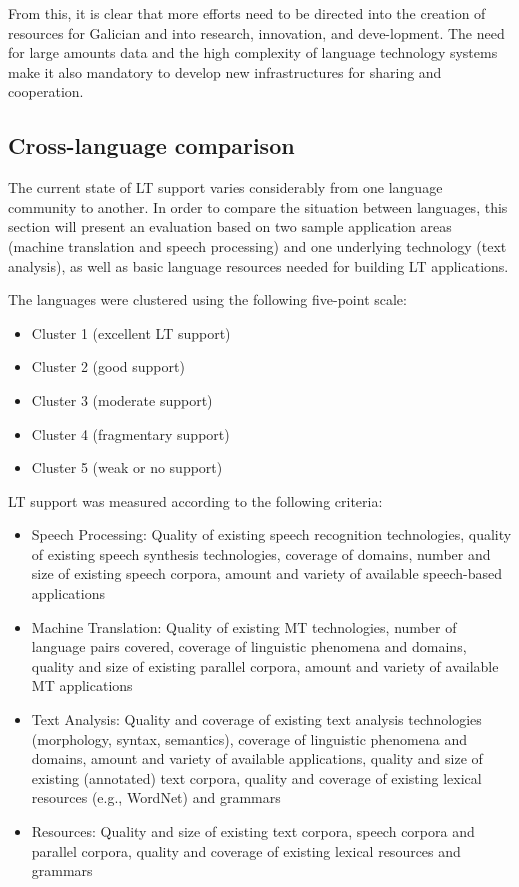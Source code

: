 \begin{multicols}{2}
\begin{itemize}
\begin{multicols}{2}
From this, it is clear that more efforts need to be directed into the creation of resources for Galician and into research, innovation, and deve-lopment. The need for large amounts data and the high complexity of language technology systems make it also mandatory to develop new infrastructures for sharing and cooperation.


\subsection{Cross-language comparison}

    The current state of LT support varies considerably from one language community to another. In order to compare the situation between languages, this section will present an evaluation based on two sample application areas (machine translation and speech processing) and one underlying technology (text analysis), as well as basic language resources needed for building LT applications. 

The languages were clustered using the following five-point scale: 

    \begin{itemize}
      \item Cluster 1 (excellent LT support)
      \item Cluster 2 (good support)
      \item Cluster 3 (moderate support)
      \item Cluster 4 (fragmentary support) 
      \item Cluster 5 (weak or no support)
    \end{itemize}

LT support was measured according to the following criteria:
\begin{itemize}
\item Speech Processing: Quality of existing speech recognition technologies, quality of existing speech synthesis technologies, coverage of domains, number and size of existing speech corpora, amount and variety of available speech-based applications
\item Machine Translation: Quality of existing MT technologies, number of language pairs covered, coverage of linguistic phenomena and domains, quality and size of existing parallel corpora, amount and variety of available MT applications
\item Text Analysis: Quality and coverage of existing text analysis technologies (morphology, syntax, semantics), coverage of linguistic phenomena and domains, amount and variety of available applications, quality and size of existing (annotated) text corpora, quality and coverage of existing lexical resources (e.g., WordNet) and grammars
\item Resources: Quality and size of existing text corpora, speech corpora and parallel corpora, quality and coverage of existing lexical resources and grammars
\end{itemize} 


\end{multicols}
\end{itemize}
\end{multicols}
